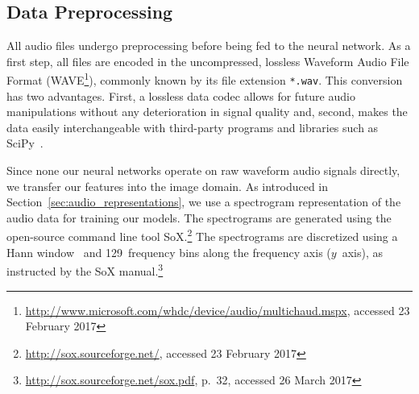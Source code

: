 \subsection{Data Preprocessing}
\label{sec:data_processing}

	All audio files undergo preprocessing before being fed to the neural network. As a first step, all files are encoded in the uncompressed, lossless Waveform Audio File Format (WAVE\footnote{\url{http://www.microsoft.com/whdc/device/audio/multichaud.mspx}, accessed 23 February 2017}), commonly known by its file extension \texttt{*.wav}. This conversion has two advantages. First, a lossless data codec allows for future audio manipulations without any deterioration in signal quality and, second, makes the data easily interchangeable with third-party programs and libraries such as SciPy~\cite{scipy}.

	Since none our neural networks operate on raw waveform audio signals directly, we transfer our features into the image domain. As introduced in Section~\ref{sec:audio_representations}, we use a spectrogram representation of the audio data for training our models. The spectrograms are generated using the open-source command line tool SoX.\footnote{\url{http://sox.sourceforge.net/}, accessed 23 February 2017} The spectrograms are discretized using a Hann window~\cite{blackman1958measurement} and \num{129}~frequency bins along the frequency axis ($y$~axis), as instructed by the SoX manual.\footnote{\url{http://sox.sourceforge.net/sox.pdf}, p.~32, accessed 26 March 2017}

